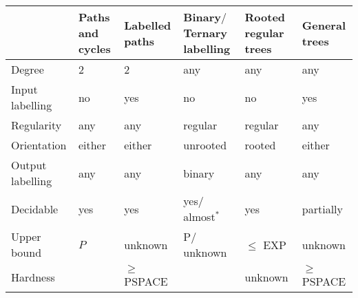 \begin{table}
  \begin{tabular}{|p{1.90cm}|p{1.90cm}|p{1.90cm}|p{1.90cm}|p{1.90cm}|p{1.90cm}|}
  \hline %
   & Paths and cycles & Labelled paths & Binary$\slash$Ternary labelling & Rooted regular trees & General trees \\
  \hline 
    Degree & 2 & 2 & any & any & any \\
  \hline

    Input labelling & no & yes & no & no & yes \\
  \hline

    Regularity & any & any & regular & regular & any \\
  \hline

    Orientation & either & either & unrooted & rooted & either \\
  \hline

    \raggedright Output labelling & any & any & binary & any & any \\
  \hline

    Decidable & yes & yes & yes$\slash$almost$^*$ & yes & partially \\
  \hline

    Upper bound & $P$ & unknown & P$\slash$unknown & $\leq$ EXP & unknown \\
  \hline

    Hardness &  & $\geq$ PSPACE &  & unknown & $\geq$ PSPACE \\
  \hline


\end{tabular}
\end{table}
